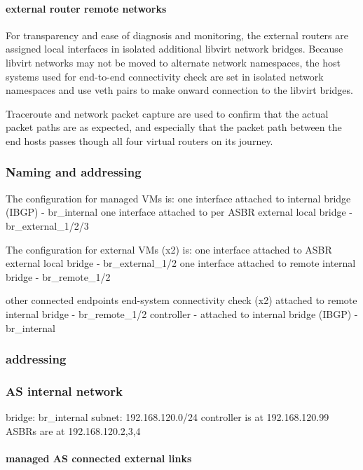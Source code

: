 \paragraph{external router remote networks}
For transparency and ease of diagnosis and monitoring, the external routers are assigned local interfaces in isolated additional libvirt network bridges.  Because libvirt networks may not be moved to alternate network namespaces, the host systems used for end-to-end connectivity check are set in isolated network namespaces and use veth  pairs to make onward connection to the libvirt bridges.

Traceroute and network packet capture are used to confirm that the actual packet paths are as expected, and especially that the packet path between the end hosts passes though all four virtual routers on its journey.

\subsubsection{Naming and addressing}

The configuration for managed VMs is:
one interface attached to internal bridge (IBGP) - br\_internal
one interface attached to per ASBR external local bridge - br\_external\_1/2/3

The configuration for external VMs (x2) is:
one interface attached to ASBR external local bridge - br\_external\_1/2
one interface attached to remote internal bridge - br\_remote\_1/2

other connected endpoints
end-system connectivity check (x2) attached to remote internal bridge - br\_remote\_1/2
\hbgp controller - attached to internal bridge (IBGP) - br\_internal


\subsubsection{addressing}

\subsubsection{AS internal network}
bridge: br\_internal
subnet: 192.168.120.0/24
controller is at 192.168.120.99
ASBRs are at 192.168.120.2,3,4

\paragraph{managed AS connected external links}

